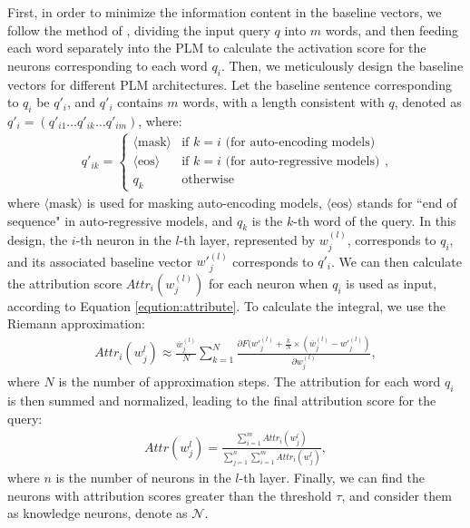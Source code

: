 \documentclass[]{article}
\begin{document}
First, in order to minimize the information content in the baseline vectors, we follow the method of \citeauthor{enguehard2023sequential}, dividing the input query $q$ into $m$ words, and then feeding each word separately into the PLM to calculate the activation score for the neurons corresponding to each word $q_i$.
Then, we meticulously design the baseline vectors for different PLM architectures. Let the baseline sentence corresponding to $q_i$ be $q'_i$, and $q'_i$ contains $m$ words, with a length consistent with $q$, denoted as $q'_i=(q'_{i1} \ldots q'_{ik} \ldots q'_{im})$, where:
{\small
\begin{align}
    q'_{ik} =
    \begin{cases}
    \langle \text{mask}\rangle  & \text{if } k = i \text{ (for auto-encoding models)} \\
    \langle \text{eos}\rangle  & \text{if } k = i \text{ (for auto-regressive models)} \\
    q_k & \text{otherwise}
    \end{cases},
\end{align}
}where $\langle \text{mask}\rangle$ is used for masking auto-encoding models, $\langle \text{eos}\rangle$ stands for ``end of sequence" in auto-regressive models, and $q_k$ is the $k$-th word of the query. In this design, the $i$-th neuron in the $l$-th layer, represented by $w_j^{(l)}$, corresponds to $q_i$,  and its associated baseline vector ${w'}^{(l)}_{j}$ corresponds to $q'_i$. We can then calculate the attribution score $Attr_i(w_j^{(l)})$ for each neuron when $q_i$ is used as input, according to Equation \eqref{eqution:attribute}.
To calculate the integral, we use the Riemann approximation:
{\small
\begin{align}
    {Attr_i(w_j^l)} \approx \frac{\overline{w}^{(l)}_{j}}{N} \sum_{k=1}^{N} \frac{ \partial F({w'}^{(l)}_{j} + \frac{k}{N} \times (\overline{w}^{(l)}_{j} - {w'}^{(l)}_{j})}{\partial {w}^{(l)}_{j}},
\end{align}}where $N$ is the number of approximation steps. The attribution for each word $q_i$ is then summed and normalized, leading to the final attribution score for the query:
{\small \begin{align}
Attr(w_j^l) = \frac{\sum_{i=1}^{m} Attr_i(w_j^l)}{\sum_{j=1}^{n} \sum_{i=1}^{m} Attr_i(w_j^l)},
\end{align}}where $n$ is the number of neurons in the $l$-th layer. Finally, we can find the neurons with attribution scores greater than the threshold $\tau$, and consider them as knowledge neurons, denote as $\mathcal{N}$.
\end{document}
